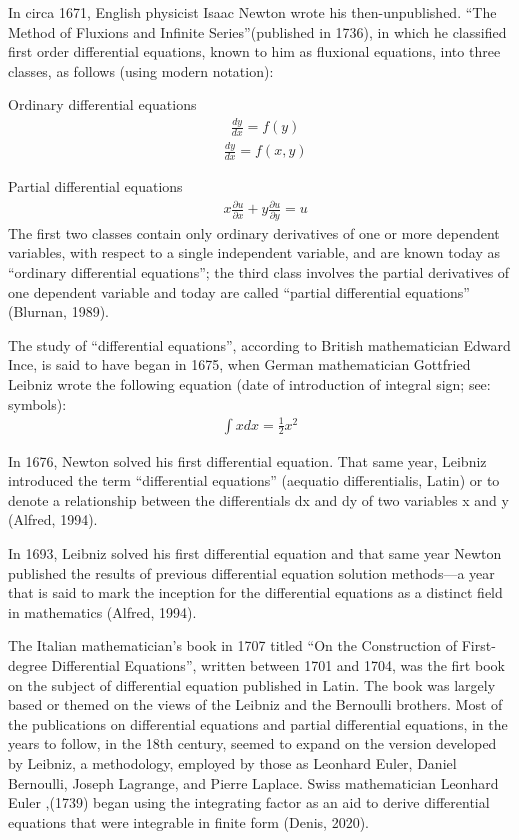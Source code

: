 \documentclass[12pt]{report}
\begin{document}
\par In circa 1671, English physicist Isaac Newton wrote his then-unpublished. “The Method of Fluxions and Infinite Series”(published in 1736), in which he classified first order differential equations, known to him as fluxional equations, into three classes, as follows (using modern notation):
\par Ordinary differential equations
\begin{align*}
&\frac{dy}{dx}=f(y)\tag{Class 1}
\end{align*}
\begin{align*}
&\frac{dy}{dx}=f(x,y)\tag{Class 2}
\end{align*}
\par Partial differential equations
\begin{align*}
& x \frac{\partial u}{\partial x}+ y\frac{\partial u}{\partial y}=u\tag{Class 3}
\end{align*}
The first two classes contain only ordinary derivatives of one or more dependent variables, with respect to a single independent variable, and are known today as “ordinary differential equations”; the third class involves the partial derivatives of one dependent variable and today are called ``partial differential equations'' (Blurnan, 1989).

\par The study of “differential equations”, according to British mathematician Edward Ince, is said to have began in 1675, when German mathematician Gottfried Leibniz wrote the following equation (date of introduction of integral sign; see: symbols):
\newpage
\begin{align*}
\int x dx = \frac {1}{2}x^2
\end{align*}
\par In 1676, Newton solved his first differential equation. That same year, Leibniz introduced the term “differential equations” (aequatio differentialis, Latin) or to denote a relationship between the differentials dx and dy of two variables x and y (Alfred, 1994).

In 1693, Leibniz solved his first differential equation and that same year Newton published the results of previous differential equation solution methods—a year that is said to mark the inception for the differential equations as a distinct field in mathematics (Alfred, 1994).

The Italian mathematician's book in 1707 titled “On the Construction of First-degree Differential Equations”, written between 1701 and 1704, was the firt book on the subject of differential equation published in Latin. The book was largely based or themed on the views of the Leibniz and the Bernoulli brothers. Most of the publications on differential equations and partial differential equations, in the years to follow, in the 18th century, seemed to expand on the version developed by Leibniz, a methodology, employed by those as Leonhard Euler, Daniel Bernoulli, Joseph Lagrange, and Pierre Laplace.  Swiss mathematician Leonhard Euler ,(1739) began using the integrating factor as an aid to derive differential equations that were integrable in finite form (Denis, 2020).\\
\end{document}
